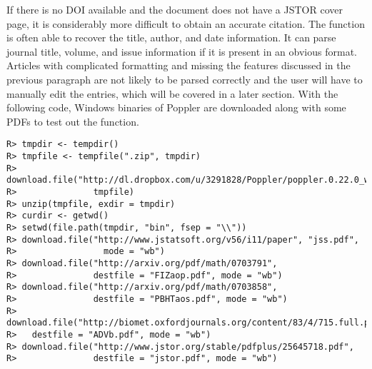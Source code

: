 \documentclass[article]{jss}\usepackage[]{graphicx}\usepackage[]{color}
\makeatletter
\newenvironment{kframe}{%
 \def\at@end@of@kframe{}%
 \ifinner\ifhmode%
  \def\at@end@of@kframe{\end{minipage}}%
  \begin{minipage}{\columnwidth}%
 \fi\fi%
 \def\FrameCommand##1{\hskip\@totalleftmargin \hskip-\fboxsep
 \colorbox{shadecolor}{##1}\hskip-\fboxsep
     \hskip-\linewidth \hskip-\@totalleftmargin \hskip\columnwidth}%
 \MakeFramed {\advance\hsize-\width
   \@totalleftmargin\z@ \linewidth\hsize
   \@setminipage}}%
 {\par\unskip\endMakeFramed%
 \at@end@of@kframe}
\newenvironment{knitrout}{}{} %
\makeatother
\begin{document}
If there is no DOI available and the document does not have a JSTOR cover page, it is considerably more difficult to obtain an accurate citation.  The function is often able to recover the title, author, and date information.  It can parse journal title, volume, and issue information if it is present in an obvious format.  Articles with complicated formatting and missing the features discussed in the previous paragraph are not likely to be parsed correctly and the user will have to manually edit the entries, which will be covered in a later section.
With the following code, Windows binaries of Poppler are downloaded along with some PDFs
to test out the function.
\begin{knitrout}
\color{fgcolor}\begin{kframe}
\begin{verbatim}
R> tmpdir <- tempdir()
R> tmpfile <- tempfile(".zip", tmpdir)
R> download.file("http://dl.dropbox.com/u/3291828/Poppler/poppler.0.22.0_win32.zip", 
R>               tmpfile)
R> unzip(tmpfile, exdir = tmpdir)
R> curdir <- getwd()
R> setwd(file.path(tmpdir, "bin", fsep = "\\"))
R> download.file("http://www.jstatsoft.org/v56/i11/paper", "jss.pdf", 
R>                 mode = "wb")
R> download.file("http://arxiv.org/pdf/math/0703791", 
R>               destfile = "FIZaop.pdf", mode = "wb")
R> download.file("http://arxiv.org/pdf/math/0703858", 
R>               destfile = "PBHTaos.pdf", mode = "wb") 
R> download.file("http://biomet.oxfordjournals.org/content/83/4/715.full.pdf", 
R>   destfile = "ADVb.pdf", mode = "wb") 
R> download.file("http://www.jstor.org/stable/pdfplus/25645718.pdf",
R>               destfile = "jstor.pdf", mode = "wb")
\end{verbatim}
\end{kframe}
\end{knitrout}
\end{document}
